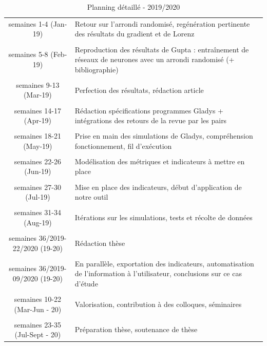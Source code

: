 \documentclass[a4paper,11pt]{article}
\begin{document}
\begin{table}[h]
	\caption{Planning détaillé - 2019/2020}
	\centering
	\begin{tabular}{c|p{22em}}
		\hline
		 semaines 1-4 (Jan-19) & Retour sur l'arrondi randomisé, regénération pertinente des résultats du gradient et de Lorenz \\
		 & \\
		 semaines 5-8 (Feb-19) & Reproduction des résultats de Gupta : entraînement de réseaux de neurones avec un arrondi randomisé (+ bibliographie) \\
		 & \\
		 semaines 9-13 (Mar-19) & Perfection des résultats, rédaction article \\
		 & \\
		 semaines 14-17 (Apr-19) & Rédaction spécifications programmes Gladys + intégrations des retours de la revue par les pairs \\
		 & \\
		 semaines 18-21 (May-19) & Prise en main des simulations de Gladys, compréhension fonctionnement, fil d'exécution \\
		 & \\
		 semaines 22-26 (Jun-19) & Modélisation des métriques et indicateurs à mettre en place \\
		 & \\
		 semaines 27-30 (Jul-19) & Mise en place des indicateurs, début d'application de notre outil \\
		 & \\
		 semaines 31-34 (Aug-19) & Itérations sur les simulations, tests et récolte de données \\
		 & \\	
		 semaines 36/2019-22/2020 (19-20) & Rédaction thèse \\
		 & \\
		 semaines 36/2019-09/2020 (19-20) & En parallèle, exportation des indicateurs, automatisation de l'information à l'utilisateur, conclusions sur ce cas d'étude \\
		 & \\
		 semaines 10-22 (Mar-Jun - 20) & Valorisation, contribution à des colloques, séminaires \\
		 & \\
		 semaines 23-35 (Jul-Sept - 20) & Préparation thèse, soutenance de thèse
	\end{tabular}
\end{table}
\end{document}
